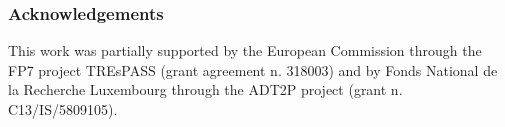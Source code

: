 \documentclass{llncs}
\begin{document}
\subsubsection*{Acknowledgements}
This work was partially supported by the European Commission through the FP7 project TREsPASS (grant agreement n. 318003) and by Fonds National de la Recherche Luxembourg through the ADT2P project (grant n. C13/IS/5809105).




\end{document}
